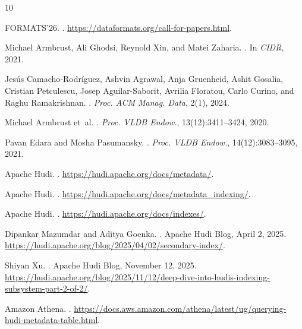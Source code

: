 \documentclass[sigconf]{acmart}
\begin{document}
\begin{thebibliography}{10}

FORMATS'26.
.
\newblock \url{https://dataformats.org/call-for-papers.html}.

Michael Armbrust, Ali Ghodsi, Reynold Xin, and Matei Zaharia.
.
\newblock In \emph{CIDR}, 2021.

Jes{\'u}s Camacho-Rodr{\'i}guez, Ashvin Agrawal, Anja Gruenheid, Ashit Gosalia, Cristian Petculescu, Josep Aguilar-Saborit, Avrilia Floratou, Carlo Curino, and Raghu Ramakrishnan.
.
\newblock \emph{Proc. ACM Manag. Data}, 2(1), 2024.

Michael Armbrust et~al.
.
\newblock \emph{Proc. VLDB Endow.}, 13(12):3411--3424, 2020.

Pavan Edara and Mosha Pasumansky.
.
\newblock \emph{Proc. VLDB Endow.}, 14(12):3083--3095, 2021.

Apache Hudi.
.
\newblock \url{https://hudi.apache.org/docs/metadata/}.

Apache Hudi.
.
\newblock \url{https://hudi.apache.org/docs/metadata_indexing/}.

Apache Hudi.
.
\newblock \url{https://hudi.apache.org/docs/indexes/}.

Dipankar Mazumdar and Aditya Goenka.
.
\newblock Apache Hudi Blog, April 2, 2025.
\newblock \url{https://hudi.apache.org/blog/2025/04/02/secondary-index/}.

Shiyan Xu.
.
\newblock Apache Hudi Blog, November 12, 2025.
\newblock \url{https://hudi.apache.org/blog/2025/11/12/deep-dive-into-hudis-indexing-subsystem-part-2-of-2/}.

Amazon Athena.
.
\newblock \url{https://docs.aws.amazon.com/athena/latest/ug/querying-hudi-metadata-table.html}.

\end{thebibliography}
\end{document}
